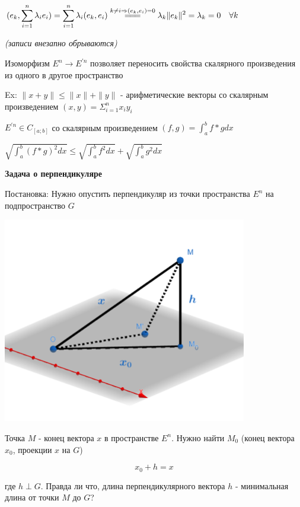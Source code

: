 \documentclass[12pt]{article}
\begin{document}
    $\displaystyle (e_k, \sum_{i=1}^n \lambda_i e_i) = \sum_{i=1}^n \lambda_i (e_k, e_i) \stackrel{k \neq i \Rightarrow (e_k, e_i) = 0}{=\joinrel=\joinrel=}
    \lambda_k \|e_k\|^2 = \lambda_k = 0 \quad \forall k$



    \textit{(записи внезапно обрываются)}



    \Nota Изоморфизм $\displaystyle E^n \rightarrow E^{\prime n}$ позволяет переносить свойства скалярного произведения
    из одного в другое пространство

    Ex: $\|x + y\| \leq \|x\| + \|y\|$ - арифметические векторы со скалярным произведением $\displaystyle (x, y) = \Sigma^n_{i=1} x_i y_i$

    $\displaystyle E^{\prime n} \in C_{[a;b]}$ со скалярным произведением $\displaystyle (f, g) = \int^b_a f * g dx$

    $\displaystyle \sqrt{\int^b_a (f * g)^2 dx} \leq \sqrt{\int^b_a f^2 dx} + \sqrt{\int^b_a g^2 dx}$

    \textbf{Задача о перпендикуляре}

    Постановка: Нужно опустить перпендикуляр из точки пространства $\displaystyle E^n$ на подпространство $G$

    \includegraphics[height=90mm]{images/specsec_2024_03_01_1}

    Точка $M$ - конец вектора $x$ в пространстве $\displaystyle E^n$.
    Нужно найти $\displaystyle M_0$ (конец вектора $\displaystyle x_0$, проекции $x$ на $G$)

    \[x_0 + h = x\]

    где $h \perp G$. Правда ли что, длина перпендикулярного вектора $h$ - минимальная длина от точки $M$ до $G$?
\end{document}
